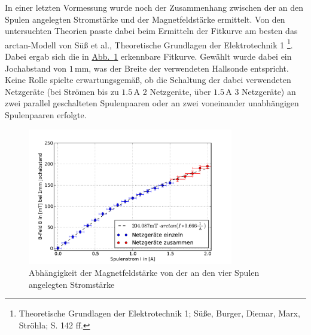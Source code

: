 \documentclass[11pt]{scrartcl}
\newcommand{\unit}[1]{\ensuremath{\,\mathrm{#1}}} %
\newcommand{\abb}[1]{\hyperref[#1]{Abb.~\ref{#1}}}
\begin{document}
In einer letzten Vormessung wurde noch der Zusammenhang zwischen der an den Spulen angelegten Stromstärke und der Magnetfeldstärke ermittelt. Von den untersuchten Theorien passte dabei beim Ermitteln der Fitkurve am besten das arctan-Modell von Süß et al., Theoretische Grundlagen der Elektrotechnik 1 \footnote{Theoretische Grundlagen der Elektrotechnik 1; Süße, Burger, Diemar, Marx, Ströhla; S. 142 ff.}. Dabei ergab sich die in \abb{messung_Strom-B-Feld} erkennbare Fitkurve.
\newpage
Gewählt wurde dabei ein Jochabstand von $1\unit{mm}$, was der Breite der verwendeten Hallsonde entspricht. Keine Rolle spielte erwartungsgemäß, ob die Schaltung der dabei verwendeten Netzgeräte (bei Strömen bis zu $1.5\unit{A}$ 2 Netzgeräte, über $1.5\unit{A}$ 3 Netzgeräte) an zwei parallel geschalteten Spulenpaaren oder an zwei voneinander unabhängigen Spulenpaaren erfolgte.

\begin{figure}[H]
\begin{center}
\includegraphics[width=0.8\textwidth]{images/messung_Strom-B-Feld.pdf}
\end{center}
\vspace{-1.5\baselineskip}
\caption{Abhängigkeit der Magnetfeldstärke von der an den vier Spulen angelegten Stromstärke}
\label{messung_Strom-B-Feld}
\end{figure}
\end{document}
